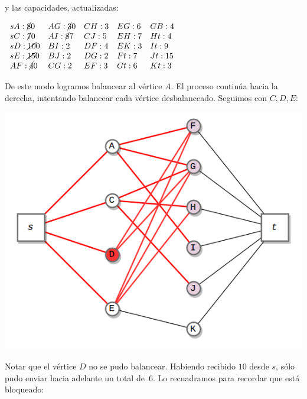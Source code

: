 \documentclass[10pt,a4paper]{article}
\begin{document}
y las capacidades, actualizadas:

\begin{center}
$\begin{array}{lllll} sA:\cancel{8} 0 & AG: \cancel{3}0 & CH: 3 & EG: 6 & GB:4\\ sC:\cancel{7 } 0 & AI: \cancel{8}7 & CJ: 5 & EH: 7 & Ht: 4\\ sD:\cancel{10} 0 & BI: 2 & DF:4 & EK: 3 & It: 9\\ sE: \cancel{15} 0 &BJ: 2 & DG: 2 & Ft: 7 & Jt: 15\\ AF: \cancel{4}0 & CG: 2 & EF: 3 & Gt: 6 & Kt: 3\\ \end{array}$
\end{center}

De este modo logramos balancear al vértice $A$. El proceso continúa hacia la derecha, intentando balancear cada vértice desbalanceado. Seguimos con $C, D, E$:

\begin{center}

    \begin{adjustbox}{max size={\textwidth}{\textheight}}
        \includegraphics{definitions/wave_4.jpg}
        \end{adjustbox}
    
\end{center}

Notar que el vértice $D$ no se pudo balancear. Habiendo recibido $10$ desde $s$, sólo pudo enviar hacia adelante un total de $6$. Lo recuadramos para recordar que está bloqueado:
\end{document}
